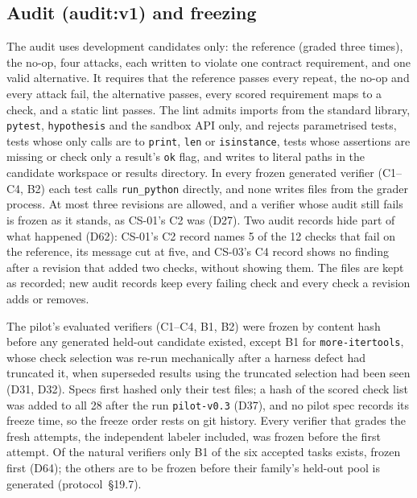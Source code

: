 \subsection{Audit (audit:v1) and freezing}
\label{sec:audit}
The audit uses development candidates only: the reference (graded three times), the no-op, four attacks, each written to violate one contract requirement, and one valid alternative. It requires that the reference passes every repeat, the no-op and every attack fail, the alternative passes, every scored requirement maps to a check, and a static lint passes. The lint admits imports from the standard library, \texttt{pytest}, \texttt{hypothesis} and the sandbox API only, and rejects parametrised tests, tests whose only calls are to \texttt{print}, \texttt{len} or \texttt{isinstance}, tests whose assertions are missing or check only a result's \texttt{ok} flag, and writes to literal paths in the candidate workspace or results directory. In every frozen generated verifier (C1--C4, B2) each test calls \texttt{run\_python} directly, and none writes files from the grader process. At most three revisions are allowed, and a verifier whose audit still fails is frozen as it stands, as CS-01's C2 was (D27). Two audit records hide part of what happened (D62): CS-01's C2 record names 5 of the 12 checks that fail on the reference, its message cut at five, and CS-03's C4 record shows no finding after a revision that added two checks, without showing them. The files are kept as recorded; new audit records keep every failing check and every check a revision adds or removes.

\label{sec:freezing}The pilot's evaluated verifiers (C1--C4, B1, B2) were frozen by content hash before any generated held-out candidate existed, except B1 for \texttt{more-itertools}, whose check selection was re-run mechanically after a harness defect had truncated it, when superseded results using the truncated selection had been seen (D31, D32). Specs first hashed only their test files; a hash of the scored check list was added to all 28 after the run \texttt{pilot-v0.3} (D37), and no pilot spec records its freeze time, so the freeze order rests on git history. Every verifier that grades the fresh attempts, the independent labeler included, was frozen before the first attempt. Of the natural verifiers only B1 of the six accepted tasks exists, frozen first (D64); the others are to be frozen before their family's held-out pool is generated (protocol~\S19.7).

